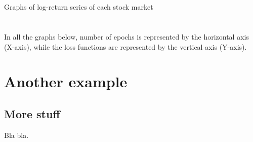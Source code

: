 \documentclass[a4paper,11pt,oneside]{book}
\begin{document}
\begin{appendix}
		\chapter{}
	
	Graphs of log-return series of each stock market	
	


	\chapter{}

	
In all the graphs below, number of epochs is represented by the
horizontal axis (X-axis), while the loss functions are represented by the vertical axis
(Y-axis).



	
	
	






	
	\chapter{Another example}
	\label{app_ex2}
	
	
	\section{More stuff}
	
	Bla bla.
	
\end{appendix}

\end{document}
